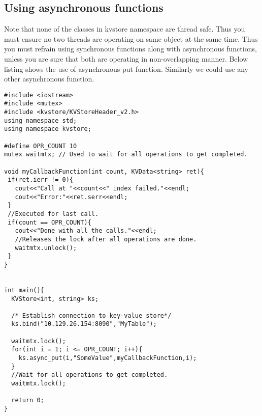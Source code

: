 \documentclass[11pt]{article}
\begin{document}
\subsection{Using asynchronous functions}
Note that none of the classes in kvstore namespace are thread safe. Thus you must ensure no two threads are operating on same object at the same time. Thus you must refrain using synchronous functions along with asynchronous functions, unless you are sure that both are operating in non-overlapping manner. Below listing shows the use of asynchronous put function. Similarly we could use any other asynchronous function.
\begin{lstlisting}
#include <iostream>
#include <mutex>
#include <kvstore/KVStoreHeader_v2.h>
using namespace std;
using namespace kvstore;

#define OPR_COUNT 10
mutex waitmtx; // Used to wait for all operations to get completed.

void myCallbackFunction(int count, KVData<string> ret){
 if(ret.ierr != 0){
   cout<<"Call at "<<count<<" index failed."<<endl;
   cout<<"Error:"<<ret.serr<<endl;
 }
 //Executed for last call.
 if(count == OPR_COUNT){ 
   cout<<"Done with all the calls."<<endl;
   //Releases the lock after all operations are done.
   waitmtx.unlock(); 
 }
}


int main(){
  KVStore<int, string> ks;
  
  /* Establish connection to key-value store*/
  ks.bind("10.129.26.154:8090","MyTable");
  
  waitmtx.lock();
  for(int i = 1; i <= OPR_COUNT; i++){
    ks.async_put(i,"SomeValue",myCallbackFunction,i);
  }
  //Wait for all operations to get completed.
  waitmtx.lock();
  
  return 0;
}
\end{lstlisting}
\end{document}
